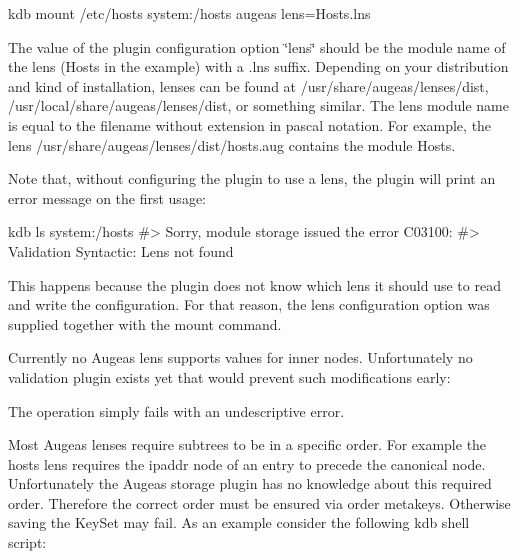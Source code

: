 \begin{DoxyCode}
kdb mount /etc/hosts system:/hosts augeas lens=Hosts.lns
\end{DoxyCode}


The value of the plugin configuration option \char`\"{}lens\char`\"{} should be the module name of the lens (Hosts in the example) with a \textquotesingle{}.lns\textquotesingle{} suffix. Depending on your distribution and kind of installation, lenses can be found at {\ttfamily /usr/share/augeas/lenses/dist}, {\ttfamily /usr/local/share/augeas/lenses/dist}, or something similar. The lens module name is equal to the filename without extension in pascal notation. For example, the lens {\ttfamily /usr/share/augeas/lenses/dist/hosts.aug} contains the module Hosts.

Note that, without configuring the plugin to use a lens, the plugin will print an error message on the first usage\+:


\begin{DoxyCode}
kdb ls system:/hosts
#> Sorry, module storage issued the error C03100:
#> Validation Syntactic: Lens not found
\end{DoxyCode}


This happens because the plugin does not know which lens it should use to read and write the configuration. For that reason, the lens configuration option was supplied together with the mount command.

Currently no Augeas lens supports values for inner nodes. Unfortunately no validation plugin exists yet that would prevent such modifications early\+:




The operation simply fails with an undescriptive error.

Most Augeas lenses require subtrees to be in a specific order. For example the hosts lens requires the ipaddr node of an entry to precede the canonical node. Unfortunately the Augeas storage plugin has no knowledge about this required order. Therefore the correct order must be ensured via order metakeys. Otherwise saving the Key\+Set may fail. As an example consider the following kdb shell script\+:


